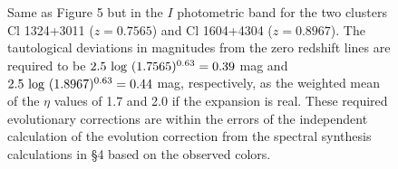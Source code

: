 \documentclass[preprint]{aastex}
\begin{document}
\begin{figure}
\caption{Same as Figure 5 but in the $I$ photometric band for the two
clusters Cl 1324+3011 ($z = 0.7565$) and Cl 1604+4304 ($z = 0.8967$).
The tautological deviations in magnitudes from the zero redshift lines
are required to be $2.5~{\rm log}~(1.7565)^{0.63} = 0.39$ mag and
$2.5~{\rm log}~(1.8967)^{0.63} = 0.44$ mag, respectively, as the
weighted mean of the $\eta$ values of 1.7 and 2.0 if the expansion is
real.  These required evolutionary corrections are within the errors
of the independent calculation of the evolution correction from the
spectral synthesis calculations in \S 4 based on the observed colors.}
\end{figure}
\end{document}
